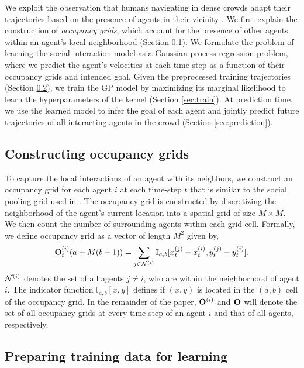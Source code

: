 We exploit the observation that humans navigating in dense crowds
adapt their trajectories based on the presence of agents in their
vicinity \cite{alahi16}.
%
%
%
%
We first explain the construction of \textit{occupancy grids}, which
account for the presence of other agents within an agent's local
neighborhood (Section \ref{sec:occupancy}).  We formulate the problem
of learning the social interaction model as a Gaussian process
regression problem, where we predict the agent's velocities at each
time-step as a function of their occupancy grids and intended
goal. Given the preprocessed training trajectories (Section
\ref{sec:preprocessing}), we train the GP model by maximizing its
marginal likelihood to learn the hyperparameters of the kernel
(Section \ref{sec:train}). At prediction time, we use the learned
model to infer the goal of each agent and jointly predict future
trajectories of all interacting agents in the crowd (Section
\ref{sec:prediction}).

\subsection{Constructing occupancy grids}
\label{sec:occupancy}
To capture the local interactions of an agent with its neighbors, we
construct an occupancy grid for each agent $i$ at each time-step $t$
that is similar to the social pooling grid used in \cite{alahi16}. The
occupancy grid is constructed by discretizing the neighborhood of the
agent's current location into a spatial grid of size $M \times M$. We
then count the number of surrounding agents within each grid
cell. Formally, we define occupancy grid as a vector of length $M^2$
given by,
\begin{equation}
  \label{eq:2}
  \mathbf{O}_t^{(i)} (a + M(b-1)) = \sum_{j \in \mathcal{N}^{(i)}}\mathbb{I}_{a,b}[x_t^{(j)} - x_t^{(i)}, y_t^{(j)} - y_t^{(i)}].
\end{equation}
$\mathcal{N}^{(i)}$ denotes the set of all agents $j \neq i$, who are
within the neighborhood of agent $i$. The indicator function
$\mathbb{I}_{a,b}[x,y]$ defines if $(x,y)$ is located in the $(a,b)$
cell of the occupancy grid.
%
%
In the remainder of the paper, $\mathbf{O}^{(i)}$ and $\mathbf{O}$ will denote
the set of all occupancy grids at every time-step of an agent $i$ and
that of all agents, respectively.
%
%
%

%
\subsection{Preparing training data for learning}
\label{sec:preprocessing}

